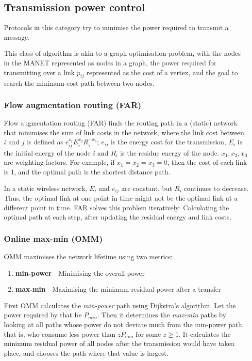 \subsection{Transmission power control}
\label{power-control}
Protocols in this category try to minimise the power required to transmit
a message.

This class of algorithm is akin to a graph optimisation problem,
with the nodes in the MANET represented as nodes in a graph, the power required for
transmitting over a link $p_{ij}$ represented as the cost of a vertex, and the goal
to search the minimum-cost path between two nodes.

\subsubsection{Flow augmentation routing (FAR)}
Flow augmentation routing (FAR)\cite{chang2000energy} finds the routing
path in a (static) network that minimises the sum of link costs in the network,
where the link cost between $i$ and $j$ is defined as \( e_{ij}^{x_{i}}E_{i}^{x_{2}}R_{i}^{-x_{3}}\);
\(e_{ij}\) is the energy cost for the transmission, $E_{i}$ is the initial energy
of the node $i$ and $R_{i}$ is the residue energy of the node. \(x_{1}, x_{2}, x_{3}\)
are weighting factors. For example, if $x_{1}=x_{2}=x_{3}=0$, then the cost
of each link is 1, and the optimal path is the shortest distance path.

In a static wireless network, $E_{i}$ and $e_{ij}$ are constant, but $R_{i}$
continues to decrease. Thus, the optimal link at one point in time might not be the
optimal link at a different point in time. FAR solves this problem iteratively:
Calculating the optimal path at each step, after updating the residual energy
and link costs.

\subsubsection{Online max-min (OMM)}
\label{omm}
OMM \cite{li2001online} maximises the network lifetime using two metrics:
\begin{enumerate}
  \item \textbf{min-power} - Minimising the overall power
  \item \textbf{max-min} - Maximising the minimum residual power after a transfer
\end{enumerate}

First OMM calculates the \textit{min-power} path using Dijkstra’s algorithm. Let
the power required by that be $P_{min}$.
Then it determines the \textit{max-min} paths by looking at all paths whose
power do not deviate much from the min-power path, that is, who consume less
power than $zP_{\min}$ for some $z \ge 1$. It calculates the minimum residual power of all nodes
after the transmission would have taken place, and chooses the path where
that value is largest.

